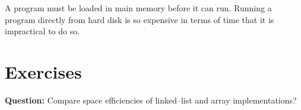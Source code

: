 \documentclass[12pt,a4paper]{article}
\begin{document}
A program must be loaded in main memory before it can run. Running a program directly from hard disk is so expensive in terms of time that it is impractical to do so.
\section{Exercises}
\noindent\textbf{Question:} Compare space efficiencies of linked--list and array implementations?\\[0.2cm]


\end{document}
